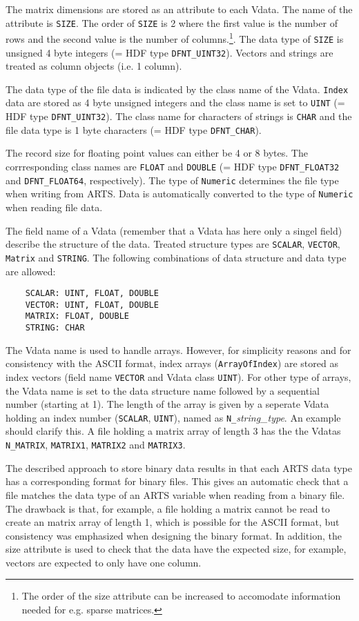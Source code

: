  The matrix dimensions are stored as an attribute to each Vdata. The
 name of the attribute is \verb|SIZE|. The order of \verb|SIZE| is 2
 where the first value is the number of rows and the second value is
 the number of columns.\footnote{The order of the size attribute can
   be increased to accomodate information needed for e.g. sparse
   matrices.}. The data type of \verb|SIZE| is unsigned 4 byte
 integers (= HDF type \verb|DFNT_UINT32|). Vectors and strings are
 treated as column objects (i.e. 1 column).
 
 The data type of the file data is indicated by the class name of the
 Vdata. \verb|Index| data are stored as 4 byte unsigned integers and
 the class name is set to \verb|UINT| (= HDF type \verb|DFNT_UINT32|).
 The class name for characters of strings is \verb|CHAR| and the file
 data type is 1 byte characters (= HDF type \verb|DFNT_CHAR|).

 The record size for floating point values can either be 4 or 8 bytes.
 The corrresponding class names are \verb|FLOAT| and \verb|DOUBLE|
 (= HDF type \verb|DFNT_FLOAT32| and \verb|DFNT_FLOAT64|, respectively).
 The type of \verb|Numeric| determines the file type when writing from
 ARTS. Data is automatically converted to the type of \verb|Numeric|
 when reading file data.
 
 The field name of a Vdata (remember that a Vdata has here only a
 singel field) describe the structure of the data. Treated structure
 types are \verb|SCALAR|, \verb|VECTOR|, \verb|Matrix| and \verb|STRING|.
 The following combinations of data structure and data type are allowed:
 \begin{verbatim}
    SCALAR: UINT, FLOAT, DOUBLE 
    VECTOR: UINT, FLOAT, DOUBLE 
    MATRIX: FLOAT, DOUBLE 
    STRING: CHAR
 \end{verbatim} 
 The Vdata name is used to handle arrays. However, for simplicity
 reasons and for consistency with the ASCII format, index arrays
 (\verb|ArrayOfIndex|) are stored as index vectors (field name
 \verb|VECTOR| and Vdata class \verb|UINT|). For other type of
 arrays, the Vdata name is set to the data structure name followed
 by a sequential number (starting at 1). The length of the array
 is given by a seperate Vdata holding an index number (\verb|SCALAR|,
 \verb|UINT|), named as \verb|N_|{\it string\_type}. An example should
 clarify this. A file holding a matrix array of length 3 has the
 the Vdatas \verb|N_MATRIX|, \verb|MATRIX1|, \verb|MATRIX2| and
 \verb|MATRIX3|.

 The described approach to store binary data results in that each
 ARTS data type has a corresponding format for binary files. This 
 gives an automatic check that a file matches the data type of
 an ARTS variable when reading from a binary file. The drawback
 is that, for example, a file holding a matrix cannot be read to create
 an matrix array of length 1, which is possible for the ASCII format,
 but consistency was emphasized when designing the binary format.
 In addition, the size attribute is used to check that the data
 have the expected size, for example, vectors are expected to only
 have one column.
 

